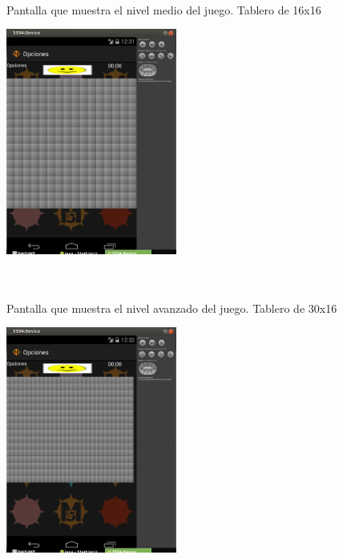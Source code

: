 \documentclass[../documentacion_buscaminas2013.tex]{subfiles}
\begin{document}
\begin{figure}[!ht]
\paragraph{ }  Pantalla que muestra el nivel medio del juego. Tablero de 16x16
\newline
	~\newline
	\begin{center}
		\includegraphics[width=0.5\textwidth]{./images/medio.png}
	\end{center}

~\newline
\paragraph{ }  Pantalla que muestra el nivel avanzado del juego. Tablero de 30x16
\newline
	~\newline
	\begin{center}
		\includegraphics[width=0.5\textwidth]{./images/avanzado.png}
	\end{center}
	

\end{figure}


\clearpage
\end{document}
